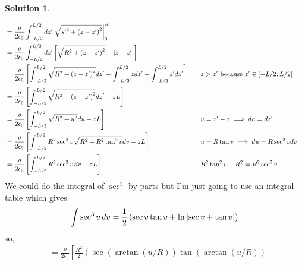 \documentclass[10pt]{article}
\theoremstyle{definition}
\newtheorem{soln}{Solution}
\newcommand{\primed}[1]{{#1^\prime}}
\newcommand{\justif}[2]{&{#1}&\text{#2}}
\begin{document}
\begin{soln}
\begin{enumerate}[label=(\alph*)]
\begin{align*}
                                 & =\frac{\rho}{2\epsilon_0}\int_{-L/2}^{L/2}d\primed{z} \eval{\sqrt{\primed{s}^2+\left(z-\primed{z}\right)^2}}_{0}^{R}                                                          \\
                                 & =\frac{\rho}{2\epsilon_0}\int_{-L/2}^{L/2}d\primed{z} \left[\sqrt{R^2+\left(z-\primed{z}\right)^2}-\abs{z-\primed{z}}\right]                                                  \\
                                 & =\frac{\rho}{2\epsilon_0}\left[\int_{-L/2}^{L/2}\sqrt{R^2+\left(z-\primed{z}\right)^2}d\primed{z}-\int_{-L/2}^{L/2}zd\primed{z}-\int_{-L/2}^{L/2}\primed{z}d\primed{z}\right]
            \justif{\quad}{$z>\primed{z}$ because $\primed{z}\in[-L/2,L/2]$}                                                                                                                                     \\
                                 & =\frac{\rho}{2\epsilon_0}\left[\int_{-L/2}^{L/2}\sqrt{R^2+\left(z-\primed{z}\right)^2}d\primed{z}-zL\right]                                                                   \\
                                 & =\frac{\rho}{2\epsilon_0}\left[\int_{-L/2}^{L/2}\sqrt{R^2+u^2}du-zL\right]\justif{\quad}{$u=\primed{z}-z\implies du=d\primed{z}$}                                             \\
                                 & =\frac{\rho}{2\epsilon_0}\left[\int_{-L/2}^{L/2}R^2\sec^2 v\sqrt{R^2 + R^2\tan^2 v}dv-zL\right]\justif{\quad}{$u=R\tan v\implies du=R\sec^2 v dv$}                            \\
                                 & =\frac{\rho}{2\epsilon_0}\left[\int_{-L/2}^{L/2}R^2\sec^3 v\,dv-zL\right]\justif{\quad}{$R^2\tan^2v +R^2=R^2\sec^2v$}                                                         \\
          \end{align*}
          We could do the integral of $\sec^3$ by parts but I'm just going to use an integral table which gives
          $$\int \sec^3 v \,dv = \frac{1}{2}\left(\sec v \tan v + \ln\abs{\sec v + \tan v}\right)$$
          so,
          \begin{align*}
             & =\frac{\rho}{2\epsilon_0}\left[\frac{R^2}{2}\left(\sec \left(\arctan\left(u/R\right)\right)\tan \left(\arctan\left(u/R\right)\right)\right.\right.                                                                                                   \\

\end{align*}
\end{enumerate}
\end{soln}
\end{document}
